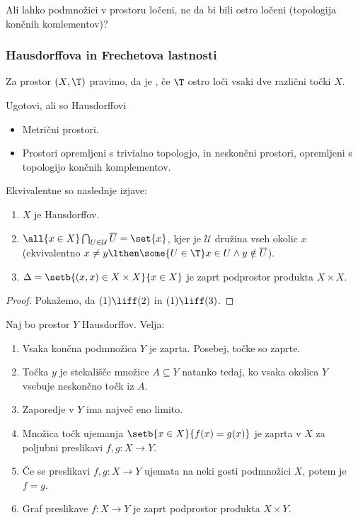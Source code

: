 \begin{primer}
    Ali lahko podmnožici v prostoru ločeni, ne da bi bili ostro ločeni (topologija končnih komlementov)?
\end{primer}

\subsubsection{Hausdorffova in Frechetova lastnosti}
\begin{definicija}
    Za prostor $(X, \T)$ pravimo, da je , če $\T$ ostro loči vsaki dve različni točki $X$.
\end{definicija}

\begin{primer}
    Ugotovi, ali so Hausdorffovi
    \begin{itemize}
        \item Metrični prostori.
        \item Prostori opremljeni s trivialno topologjo, in neskončni prostori, opremljeni s topologijo končnih komplementov.
    \end{itemize}
\end{primer}

\begin{trditev}
    Ekvivalentne so naslednje izjave:
    \begin{enumerate}
        \item $X$ je Hausdorffov.
        \item $\all{x \in X} \bigcap_{U \in \mathcal{U}} \overline{U} = \set{x}$, kjer je $\mathcal{U}$ družina vseh okolic $x$ (ekvivalentno $x \neq y \lthen \some{U \in \T} x \in U \land y \notin \overline{U}$).
        \item {} $\Delta = \setb{(x,x) \in X \times X}{x \in X}$ je zaprt podprostor produkta $X \times X$.
    \end{enumerate}
\end{trditev}

\begin{proof}
    Pokažemo, da $(1) \liff (2)$ in $(1) \liff (3)$.
\end{proof}

\begin{izrek}
    Naj bo prostor $Y$ Hausdorffov. Velja:
    \begin{enumerate}
        \item Vsaka končna podmnožica $Y$ je zaprta. Posebej, točke so zaprte.
        \item Točka $y$ je stekališče množice $A \subseteq Y$ natanko tedaj, ko vsaka okolica $Y$ vsebuje neskončno točk iz $A$.
        \item Zaporedje v $Y$ ima največ eno limito.
        \item Množica točk ujemanja $\setb{x \in X}{f(x) = g(x)}$ je zaprta v $X$ za poljubni preslikavi $f, g: X \to Y$.
        \item Če se preslikavi $f, g: X \to Y$ ujemata na neki gosti podmnožici $X$, potem je $f = g$.
        \item Graf preslikave $f: X \to Y$ je zaprt podprostor produkta $X \times Y$.
    \end{enumerate}
\end{izrek}

